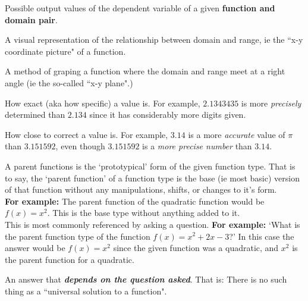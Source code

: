 \documentclass{ximera}
\begin{document}
\begin{definition}[Range]
    Possible output values of the dependent variable of a given \textbf{function and domain pair}.
\end{definition}

\begin{definition}
    A visual representation of the relationship between domain and range, ie the ``x-y coordinate picture" of a function.
\end{definition}

\begin{definition}
    A method of graping a function where the domain and range meet at a right angle (ie the so-called ``x-y plane".)
\end{definition}

\begin{definition}[Precision]
    How exact (aka how specific) a value is. For example, $2.1343435$ is more \emph{precisely} determined than $2.134$ since it has considerably more digits given.
\end{definition}

\begin{definition}[Accuracy]
    How close to correct a value is. For example, $3.14$ is a more \emph{accurate} value of $\pi$ than $3.151592$, even though $3.151592$ is a \emph{more precise number} than $3.14$.
\end{definition}

\begin{definition}
    A parent functions is the `prototypical' form of the given function type. That is to say, the `parent function' of a function type is the base (ie most basic) version of that function without any manipulations, shifts, or changes to it's form. \\
    \textbf{For example:} The parent function of the quadratic function would be $f(x) = x^2$. This is the base type without anything added to it.\\
    This is most commonly referenced by asking a question. \textbf{For example:} `What is the parent function type of the function $f(x) = x^2 + 2x - 3$?' In this case the answer would be $f(x) = x^2$ since the given function was a quadratic, and $x^2$ is the parent function for a quadratic.
\end{definition}

\begin{definition}[Solution]
    An answer that \textbf{\emph{depends on the question asked}}. That is: There is no such thing as a ``universal solution to a function".
\end{definition}
\end{document}
